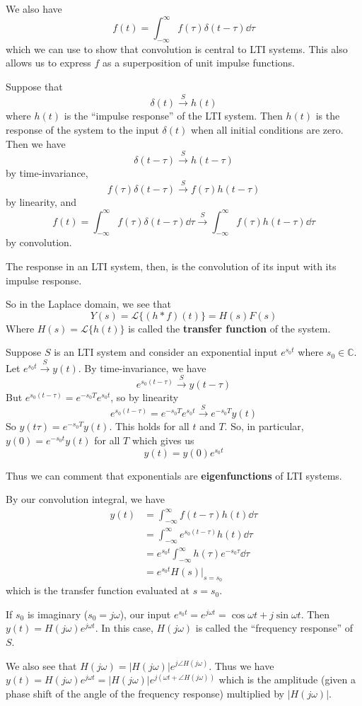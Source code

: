\documentclass[12pt]{article}
\newcommand{\laplace}[1]{\ensuremath{\mathcal{L} \{#1\}}}
\begin{document}
We also have \[ f(t) = \int_{-\infty}^\infty f(\tau) \delta(t-\tau) \dd\tau \] which we can use to show that convolution is central to LTI systems. This also allows us to express $f$ as a superposition of unit impulse functions.

Suppose that \[ \delta(t) \xrightarrow{S} h(t) \] where $h(t)$ is the ``impulse response'' of the LTI system. Then $h(t)$ is the response of the system to the input $\delta(t)$ when all initial conditions are zero. Then we have \[ \delta(t-\tau) \xrightarrow{S} h(t-\tau) \] by time-invariance, \[ f(\tau) \delta(t-\tau) \xrightarrow{S} f(\tau)h(t-\tau) \] by linearity, and \[ f(t) = \int_{-\infty}^\infty f(\tau) \delta(t-\tau) \dd\tau \xrightarrow{S} \int_{-\infty}^\infty f(\tau) h(t-\tau) \dd\tau \] by convolution.

The response in an LTI system, then, is the convolution of its input with its impulse response.

So in the Laplace domain, we see that \[ Y(s) = \laplace{(h * f)(t)} = H(s)F(s) \] Where $H(s) = \laplace{h(t)}$ is called the {\bf transfer function} of the system.

\begin{example}
Suppose $S$ is an LTI system and consider an exponential input $e^{s_0 t}$ where $s_0 \in \mathbb{C}$. Let $e^{s_0 t} \xrightarrow{S} y(t)$. By time-invariance, we have \[ e^{s_0 (t-\tau)} \xrightarrow{S} y(t-\tau) \] But $e^{s_0(t-\tau)} = e^{-s_0 T} e^{s_0t}$, so by linearity \[ e^{s_0(t-\tau)} = e^{-s_0T} e^{s_0t} \xrightarrow{S} e^{-s_0T}y(t) \] So $y(t\tau) = e^{-s_0T} y(t)$. This holds for all $t$ and $T$. So, in particular, $y(0) = e^{-s_0t}y(t)$ for all $T$ which gives us \[ y(t) = y(0) e^{s_0t} \]

Thus we can comment that exponentials are {\bf eigenfunctions} of LTI systems.

By our convolution integral, we have
\begin{align*}
y(t) &= \int_{-\infty}^\infty f(t-\tau)h(t) \dd\tau\\
&= \int_{-\infty}^\infty e^{s_0(t-\tau)}h(t) \dd\tau\\
&= e^{s_0t} \int_{-\infty}^\infty h(\tau) e^{-s_0\tau} \dd\tau\\
&= e^{s_0t} H(s) \bigg|_{s=s_0}
\end{align*}
which is the transfer function evaluated at $s=s_0$.

If $s_0$ is imaginary ($s_0 = j\omega$), our input $e^{s_0 t} = e^{j\omega t} = \cos\omega t + j\sin\omega t$. Then $y(t) = H(j\omega)e^{j\omega t}$. In this case, $H(j\omega)$ is called the ``frequency response'' of $S$.

We also see that $H(j\omega) = |H(j\omega)| e^{j\angle H(j\omega)}$. Thus we have $y(t) = H(j\omega)e^{j\omega t} = |H(j\omega)| e^{j(\omega t + \angle H(j\omega))}$ which is the amplitude (given a phase shift of the angle of the frequency response) multiplied by $|H(j\omega)|$.
\end{example}
\end{document}
